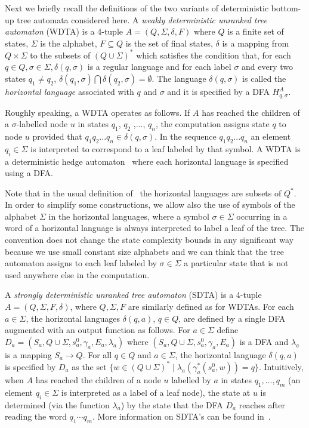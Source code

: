 \documentclass[copyright]{eptcs}
\begin{document}
Next we briefly recall the definitions of the two variants of
deterministic bottom-up tree automata considered here.
A {\em weakly deterministic unranked tree automaton} (WDTA) is a
4-tuple $A=(Q,\Sigma,\delta,F)$ where $Q$ is a finite set of
states, $\Sigma$ is the alphabet, $F \subseteq Q$ is the set of
final states, $\delta$ is a mapping from $Q\times\Sigma$ to the
subsets of $(Q \cup \Sigma)^*$
which satisfies the condition that, for each $q
\in Q, \sigma \in \Sigma, \delta(q,\sigma)$ is a regular language
and for each label $\sigma$ and every two states $q_1\neq q_2$,
$\delta(q_1,\sigma)\bigcap\delta(q_2,\sigma)=\emptyset$. The
language $\delta(q,\sigma)$ is called the {\em horizontal
language} associated with $q$ and $\sigma$ and it is specified
by a DFA $H_{q,\sigma}^A$.

Roughly speaking, a WDTA operates as follows.
If $A$ has reached the children of a
$\sigma$-labelled node $u$ in states
 $q_1$, $q_2$ ,..., $q_n$, the
computation assigns state $q$ to node $u$ provided that
$q_1q_2...q_n\in\delta(q,\sigma)$. In the sequence
$q_1q_2...q_n$ an element $q_i \in \Sigma$ is interpreted to
correspond to a leaf labeled by that symbol.
A WDTA is a deterministic
hedge automaton~\cite{CDG} where each horizontal language
is specified using a DFA.

Note that in the usual definition of~\cite{CDG} the
horizontal languages
are subsets of $Q^*$. In order to simplify some constructions,
 we allow also the use of symbols  of the
alphabet $\Sigma$ in the horizontal languages, where
a symbol $\sigma \in \Sigma$ occurring in a word of
a horizontal language is always interpreted to label
a leaf of the tree.
The convention does not
change the state complexity bounds in any
significant way because we use small
constant size alphabets and we can think that the tree automaton
assigns to each leaf labeled by $\sigma \in \Sigma$ a particular
state that is not used anywhere else in the computation.

A {\em strongly deterministic unranked tree automaton} (SDTA) is a
4-tuple $A=(Q,\Sigma,F,\delta)$, where $Q, \Sigma, F$ are
similarly defined as for WDTAs. For each $a \in \Sigma$, the
horizontal languages $\delta(q, a)$, $q \in Q$, are defined by a
single DFA augmented with an output function as follows. For $a
\in \Sigma$ define $D_a=(S_a,Q \cup \Sigma,s_a^0,\gamma_a,E_a,
\lambda_a)$ where $(S_a,Q \cup \Sigma,s_a^0,\gamma_a,E_a)$ is a
DFA and $\lambda_a$ is a mapping $S_a\rightarrow Q$. For all $q
\in Q$ and $a \in \Sigma$, the horizontal language $\delta(q,a)$
is specified by $D_a$ as the set $\{ w \in (Q \cup \Sigma)^* \mid
\lambda_a(\gamma_a^*(s_a^0,w))=q\}$. Intuitively, when $A$ has
reached the children of a node $u$ labelled by $a$ in states $q_1,
\ldots, q_m$ (an element $q_i \in \Sigma$ is interpreted as a
label of a leaf node), the state at $u$ is determined (via the
function $\lambda_a$) by the state that the DFA $D_a$ reaches
after reading the word $q_1 \cdots q_m$. More information on
SDTA's can be found in~\cite{CLT}.
\end{document}

